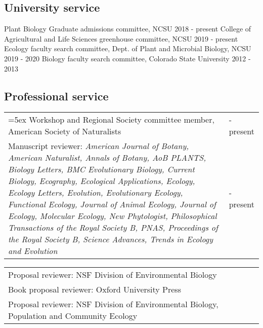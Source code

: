 \documentclass[11pt,english]{article}\usepackage[]{graphicx}\usepackage[]{color}
\providecommand{\tabularnewline}{\\}
\begin{document}
\subsection*{University service}
Plant Biology Graduate admissions committee, NCSU \hfill{2018 - present} \newline
College of Agricultural and Life Sciences greenhouse committee, NCSU \hfill{2019 - present}\newline
Ecology faculty search committee, Dept. of Plant and Microbial Biology, NCSU \hfill{2019 - 2020 }\newline
Biology faculty search committee, Colorado State University \hfill{2012 - 2013} 

\subsection*{Professional service}
\renewcommand{\arraystretch}{1.2}
\begin{tabularx}{\textwidth}{@{}>{\raggedright}p{5.25in} >{\raggedleft}X@{}}
\hangindent=5ex 
Workshop and Regional Society committee member, American Society of Naturalists & 2021 - present \tabularnewline
Manuscript reviewer: \emph{American Journal of Botany, American Naturalist, Annals of Botany, AoB PLANTS, Biology Letters, BMC Evolutionary Biology, Current Biology, Ecography, Ecological Applications, Ecology, Ecology Letters, Evolution, Evolutionary Ecology, Functional Ecology, Journal of Animal Ecology, Journal of Ecology, Molecular Ecology, New Phytologist, Philosophical Transactions of the Royal Society B, PNAS, Proceedings of the Royal Society B, Science Advances, Trends in Ecology and Evolution} & 2009 - present \tabularnewline

\end{tabularx}

\renewcommand{\arraystretch}{1.2} 
\begin{tabularx}{\textwidth}{@{}>{\raggedright}p{5.25in} >{\raggedleft}X@{}}

Proposal reviewer: NSF Division of Environmental Biology & 2021 \tabularnewline    
Book proposal reviewer: Oxford University Press & 2018 \tabularnewline                               
Proposal reviewer: NSF Division of Environmental Biology, Population and Community Ecology & 2014 
\end{tabularx}
\end{document}

